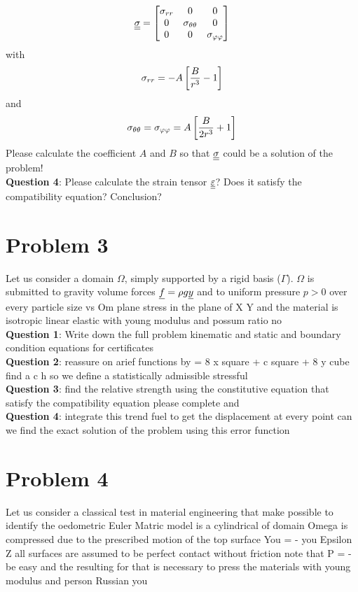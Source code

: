 \documentclass[letter,12pt]{article}
\begin{document}
\begin{equation}
\underline{\underline{\sigma}} = \left[ \begin{matrix}
\sigma_{rr} &0 &0 \\
0 & \sigma_{\theta\theta} & 0 \\
0 & 0 & \sigma_{\varphi\varphi}
\end{matrix} \right]
\end{equation}
with 
\begin{equation}
\sigma_{rr} = -A\left[\frac{B}{r^3} - 1 \right]
\end{equation}
and 
\begin{equation}
\sigma_{\theta\theta} = \sigma_{\varphi\varphi} = A \left[\frac{B}{2r^3} + 1 \right]
\end{equation}
 Please calculate the coefficient $A$ and $B$ so that $\underline{\underline{\sigma}}$ could be a solution of the problem! \\

\noindent \textbf{Question 4}: Please calculate the strain tensor $\underline{\underline{\varepsilon}}$? Does it satisfy the compatibility equation? Conclusion?

\section{Problem 3}
Let us consider a domain $\Omega$, simply supported by a rigid basis ($\Gamma$). $\Omega$ is submitted to gravity volume forces $\underline{f} = \rho g \underline{y} $ and to uniform pressure $p > 0$ over every particle size vs Om plane stress in the plane of X Y and the material is isotropic linear elastic with young modulus and possum ratio no \\

\noindent \textbf{Question 1}: Write down the full problem kinematic and static and boundary condition equations for certificates \\

\noindent \textbf{Question 2}: reassure on arief functions by = 8 x square + c square + 8 y cube find a c h so we define a statistically admissible stressful \\

\noindent \textbf{Question 3}: find the relative strength using the constitutive equation that satisfy the compatibility equation please complete and \\

\noindent \textbf{Question 4}: integrate this trend fuel to get the displacement at every point can we find the exact solution of the problem using this error function

\section{Problem 4}
Let us consider a classical test in material engineering that make possible to identify the oedometric Euler Matric model is a cylindrical of domain Omega is compressed due to the prescribed motion of the top surface You = - you Epsilon Z all surfaces are assumed to be perfect contact without friction note that P = - be easy and the resulting for that is necessary to press the materials with young modulus and person Russian you \\
\end{document}
